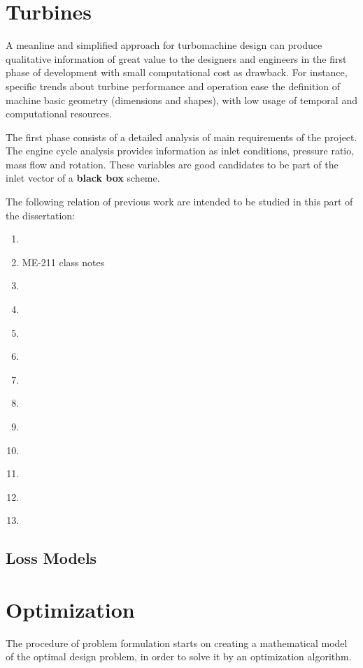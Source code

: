 \section{Turbines}
A meanline and simplified approach for turbomachine design can produce qualitative information of great value to the designers and engineers in the first phase of development with small computational cost as drawback. For instance, specific trends about turbine performance and operation ease the definition of machine basic geometry (dimensions and shapes), with low usage of temporal and computational resources.

The first phase consists of a detailed analysis of main requirements of the project. The engine cycle analysis provides information as inlet conditions, pressure ratio, mass flow and rotation. These variables are good candidates to be part of the inlet vector of a \textbf{black box} scheme.

The following relation of previous work are intended to be studied in this part of the dissertation:
\begin{enumerate}
    \item \cite{Saravanamuttoo2017}
    \item ME-211 class notes
    \item \cite{Ovsyannikov1971}
    \item \cite{Belyaev1999}
    \item \cite{IgorGeorge2020}
    \item \cite{Schobeiri2018}
    \item \cite{Denton1993}
    \item \cite{Maia2019}
    \item \cite{Denton1998}
    \item \cite{Craig1970}
    \item \cite{Leach1983}
    \item \cite{Kadhim2018}
    \item \cite{DentonWallis1998}
\end{enumerate}

\subsection{Loss Models}

\section{Optimization}
The procedure of problem formulation starts on creating a mathematical model of the optimal design problem, in order to solve it by an optimization algorithm.

